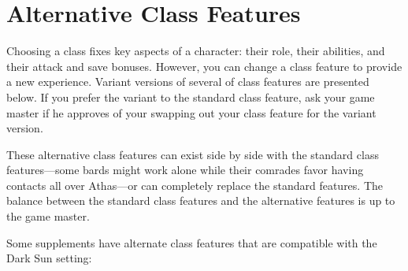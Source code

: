 \section{Alternative Class Features}
Choosing a class fixes key aspects of a character: their role, their abilities, and their attack and save bonuses. However, you can change a class feature to provide a new experience. Variant versions of several of class features are presented below. If you prefer the variant to the standard class feature, ask your game master if he approves of your swapping out your class feature for the variant version.

These alternative class features can exist side by side with the standard class features---some bards might work alone while their comrades favor having contacts all over Athas---or can completely replace the standard features. The balance between the standard class features and the alternative features is up to the game master.

Some supplements have alternate class features that are compatible with the {\tableheader Dark Sun} setting:

